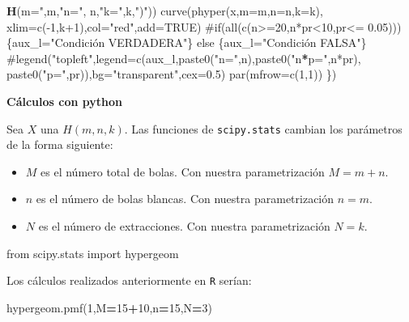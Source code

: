 \documentclass[]{book}
\newenvironment{Shaded}{\begin{snugshade}}{\end{snugshade}}
\newcommand{\DataTypeTok}[1]{\textcolor[rgb]{0.13,0.29,0.53}{#1}}
\newcommand{\DecValTok}[1]{\textcolor[rgb]{0.00,0.00,0.81}{#1}}
\newcommand{\ImportTok}[1]{#1}
\newcommand{\KeywordTok}[1]{\textcolor[rgb]{0.13,0.29,0.53}{\textbf{#1}}}
\newcommand{\NormalTok}[1]{#1}
\newcommand{\OperatorTok}[1]{\textcolor[rgb]{0.81,0.36,0.00}{\textbf{#1}}}
\newcommand{\StringTok}[1]{\textcolor[rgb]{0.31,0.60,0.02}{#1}}
\providecommand{\tightlist}{%
  \setlength{\itemsep}{0pt}\setlength{\parskip}{0pt}}
\begin{document}
\begin{Shaded}
\begin{Highlighting}[]
                     \KeywordTok{H}\NormalTok{(}\DataTypeTok{m=}\StringTok{",m,"}\DataTypeTok{n=}\StringTok{", n,"}\DataTypeTok{k=}\StringTok{",k,"}\NormalTok{)}\StringTok{"))}
\StringTok{  curve(phyper(x,m=m,n=n,k=k),}
\StringTok{        xlim=c(-1,k+1),col="}\NormalTok{red}\StringTok{",add=TRUE)}
\StringTok{  #if(all(c(n>=20,n*pr<10,pr<= 0.05)))\{aux_l="}\NormalTok{Condición VERDADERA}\StringTok{"\} }
\StringTok{  else \{aux_l="}\NormalTok{Condición FALSA}\StringTok{"\}}
\StringTok{  #legend("}\NormalTok{topleft}\StringTok{",legend=c(aux_l,paste0("}\DataTypeTok{n=}\StringTok{",n),paste0("}\NormalTok{n}\OperatorTok{*}\DataTypeTok{p=}\StringTok{",n*pr),}
\StringTok{  paste0("}\DataTypeTok{p=}\StringTok{",pr)),bg="}\NormalTok{transparent}\StringTok{",cex=0.5)}
\StringTok{  par(mfrow=c(1,1))}
\StringTok{\})}
\end{Highlighting}
\end{Shaded}

\textbf{Cálculos con python}

Sea \(X\) una \(H(m,n,k)\). Las funciones de \texttt{scipy.stats} cambian los parámetros de la forma siguiente:

\begin{itemize}
\tightlist
\item
  \(M\) es el número total de bolas. Con nuestra parametrización \(M=m+n\).
\item
  \(n\) es el número de bolas blancas. Con nuestra parametrización \(n=m\).
\item
  \(N\) es el número de extracciones. Con nuestra parametrización \(N=k\).
\end{itemize}

\begin{Shaded}
\begin{Highlighting}[]
\ImportTok{from}\NormalTok{ scipy.stats }\ImportTok{import}\NormalTok{ hypergeom}
\end{Highlighting}
\end{Shaded}

Los cálculos realizados anteriormente en \texttt{R} serían:

\begin{Shaded}
\begin{Highlighting}[]
\NormalTok{hypergeom.pmf(}\DecValTok{1}\NormalTok{,M}\OperatorTok{=}\DecValTok{15}\OperatorTok{+}\DecValTok{10}\NormalTok{,n}\OperatorTok{=}\DecValTok{15}\NormalTok{,N}\OperatorTok{=}\DecValTok{3}\NormalTok{)}
\end{Highlighting}
\end{Shaded}
\end{document}
